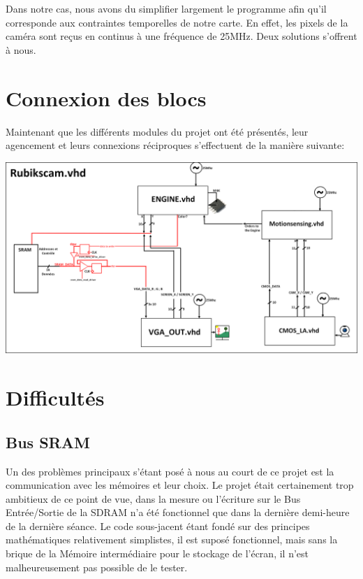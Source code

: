 \documentclass[10pt,a4paper]{report}
\begin{document}
Dans notre cas, nous avons du simplifier largement le programme afin qu'il corresponde aux contraintes temporelles de notre carte. En effet, les pixels de la caméra sont reçus en continus à une fréquence de 25MHz. Deux solutions s'offrent à nous.

\chapter{Connexion des blocs}

Maintenant que les différents modules du projet ont été présentés, leur agencement et leurs connexions réciproques s'effectuent de la manière suivante:

\begin{landscape}
\begin{center}
\includegraphics[width=590pt]{gfx/whole.png}
\end{center}
\end{landscape}
\chapter{Difficultés}

\section{Bus SRAM}
Un des problèmes principaux s'étant posé à nous au court de ce projet est la communication avec les mémoires et leur choix. Le projet était certainement trop ambitieux de ce point de vue, dans la mesure ou l'écriture sur le Bus Entrée/Sortie de la SDRAM n'a été fonctionnel que dans la dernière demi-heure de la dernière séance. Le code sous-jacent étant fondé sur des principes mathématiques relativement simplistes, il est suposé fonctionnel, mais sans la brique de la Mémoire intermédiaire pour le stockage de l'écran, il n'est malheureusement pas possible de le tester.
\end{document}
